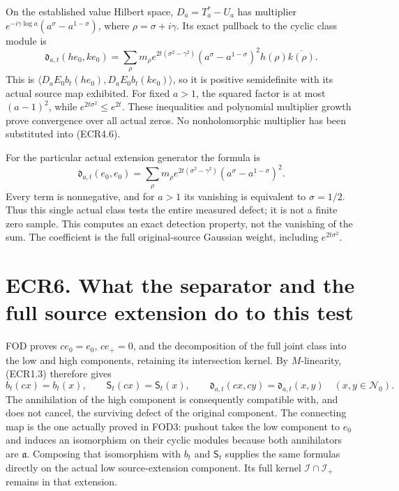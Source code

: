 On the established value Hilbert space, \(D_a=T_a^*-U_a\) has multiplier
\(e^{-i\gamma\log a}(a^\sigma-a^{1-\sigma})\), where
\(\rho=\sigma+i\gamma\). Its exact pullback to the cyclic class module
is \[
\mathfrak d_{a,t}(h e_0,k e_0)
=\sum_\rho m_\rho e^{2t(\sigma^2-\gamma^2)}
(a^\sigma-a^{1-\sigma})^2h(\rho)\overline{k(\rho)}.
\tag{ECR5.4}
\] This is \(\langle D_aE_0b_t(h e_0),D_aE_0b_t(k e_0)\rangle\), so it
is positive semidefinite with its actual source map exhibited. For fixed
\(a>1\), the squared factor is at most \((a-1)^2\), while
\(e^{2t\sigma^2}\le e^{2t}\). These inequalities and polynomial
multiplier growth prove convergence over all actual zeros. No
nonholomorphic multiplier has been substituted into (ECR4.6).

For the particular actual extension generator the formula is \[
\mathfrak d_{a,t}(e_0,e_0)
=\sum_\rho m_\rho e^{2t(\sigma^2-\gamma^2)}
(a^\sigma-a^{1-\sigma})^2.
\tag{ECR5.5}
\] Every term is nonnegative, and for \(a>1\) its vanishing is
equivalent to \(\sigma=1/2\). Thus this single actual class tests the
entire measured defect; it is not a finite zero sample. This computes an
exact detection property, not the vanishing of the sum. The coefficient
is the full original-source Gaussian weight, including
\(e^{2t\sigma^2}\).

\section{ECR6. What the separator and the full source extension do to
this
test}\label{ecr6.-what-the-separator-and-the-full-source-extension-do-to-this-test}

FOD proves \(c e_0=e_0\), \(c e_+=0\), and the decomposition of the full
joint class into the low and high components, retaining its intersection
kernel. By \(M\)-linearity, (ECR1.3) therefore gives \[
b_t(c x)=b_t(x),\qquad \mathsf S_t(c x)=\mathsf S_t(x),
\qquad
\mathfrak d_{a,t}(c x,c y)=\mathfrak d_{a,t}(x,y)
\quad(x,y\in\mathscr N_0).
\tag{ECR6.1}
\] The annihilation of the high component is consequently compatible
with, and does not cancel, the surviving defect of the original
component. The connecting map is the one actually proved in FOD3:
pushout takes the low component to \(e_0\) and induces an isomorphism on
their cyclic modules because both annihilators are \(\mathfrak a\).
Composing that isomorphism with \(b_t\) and \(\mathsf S_t\) supplies the
same formulas directly on the actual low source-extension component. Its
full kernel \(\mathcal I\cap\mathcal I_+\) remains in that extension.

